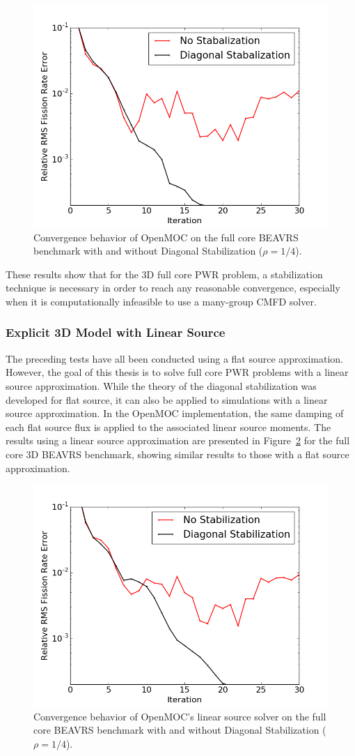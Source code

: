 \begin{figure}[ht!]
	\centering
	\includegraphics[width=0.65\linewidth]{figures/convergence/full-core-3D.png}
	\caption{Convergence behavior of OpenMOC on the full core \ac{BEAVRS} benchmark with and without Diagonal Stabilization ($\rho = 1/4$).}
	\label{fig:fc-3D}
\end{figure}

These results show that for the 3D full core \ac{PWR} problem, a stabilization technique is necessary in order to reach any reasonable convergence, especially when it is computationally infeasible to use a many-group \ac{CMFD} solver.

\subsubsection{Explicit 3D Model with Linear Source}

The preceding tests have all been conducted using a flat source approximation. However, the goal of this thesis is to solve full core \ac{PWR} problems with a linear source approximation. While the theory of the diagonal stabilization was developed for flat source, it can also be applied to simulations with a linear source approximation. In the OpenMOC implementation, the same damping of each flat source flux is applied to the associated linear source moments. The results using a linear source approximation are presented in Figure~\ref{fig:fc-3D-ls} for the full core 3D BEAVRS benchmark, showing similar results to those with a flat source approximation.

\begin{figure}[ht!]
	\centering
	\includegraphics[width=0.65\linewidth]{figures/convergence/full-core-3D-ls.png}
	\caption{Convergence behavior of OpenMOC's linear source solver on the full core \ac{BEAVRS} benchmark with and without Diagonal Stabilization ($\rho = 1/4$).}
	\label{fig:fc-3D-ls}
\end{figure}

